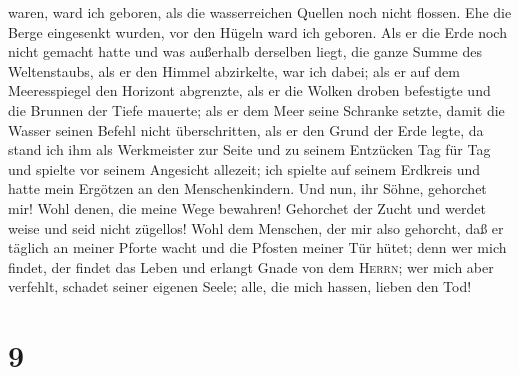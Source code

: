 waren, ward ich geboren, als die wasserreichen Quellen noch nicht
flossen.  Ehe die Berge eingesenkt wurden, vor den Hügeln
ward ich geboren.  Als er die Erde noch nicht gemacht
hatte und was außerhalb derselben liegt, die ganze Summe des
Weltenstaubs,  als er den Himmel abzirkelte, war ich
dabei; als er auf dem Meeresspiegel den Horizont abgrenzte,
 als er die Wolken droben befestigte und die Brunnen der
Tiefe mauerte;  als er dem Meer seine Schranke setzte,
damit die Wasser seinen Befehl nicht überschritten, als er den Grund der
Erde legte,  da stand ich ihm als Werkmeister zur Seite
und zu seinem Entzücken Tag für Tag und spielte vor seinem Angesicht
allezeit;  ich spielte auf seinem Erdkreis und hatte mein
Ergötzen an den Menschenkindern.  Und nun, ihr Söhne,
gehorchet mir! Wohl denen, die meine Wege bewahren! 
Gehorchet der Zucht und werdet weise und seid nicht zügellos!
 Wohl dem Menschen, der mir also gehorcht, daß er täglich
an meiner Pforte wacht und die Pfosten meiner Tür hütet; 
denn wer mich findet, der findet das Leben und erlangt Gnade von dem
\textsc{Herrn};  wer mich aber verfehlt, schadet seiner
eigenen Seele; alle, die mich hassen, lieben den Tod!

\hypertarget{section-8}{%
\section{9}\label{section-8}}

